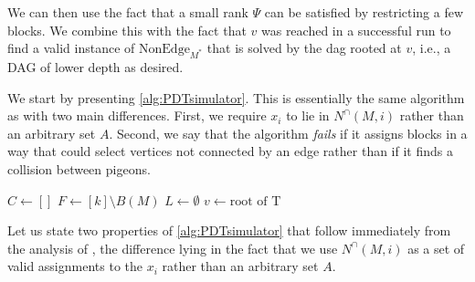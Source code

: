 We can then use the fact that a small rank $\Psi$ can be satisfied
by restricting a few blocks. We combine this with the fact that $v$ was reached in a successful run to find a valid instance of $\mathrm{NonEdge}_{M^*}$ that is solved by the dag rooted at $v$, i.e., a DAG of lower depth as desired.

We start by presenting \autoref{alg:PDTsimulator}. This is essentially the same algorithm as \cite[Algorithm 1]{BI25bphp} with two main differences. First, we require $x_i$ to lie in $N^\cap(M,i)$ rather than an arbitrary set $A$. Second, we say that the algorithm \emph{fails} if it assigns blocks in a way that could select vertices not connected by an edge rather than if it finds a collision between pigeons.  

\begin{algorithm2e}[t!]
\caption{Random walk simulator}
\label{alg:PDTsimulator}
    $C\leftarrow []$
    $F\leftarrow [k]\setminus B(M)$ 
    $L\leftarrow \emptyset$
    $v\leftarrow \text{root of T}$\;
\end{algorithm2e}


Let us state two properties of \autoref{alg:PDTsimulator} that follow immediately from the analysis of \cite{BI25bphp}, the difference lying in the fact that we use $N^\cap(M,i)$ as a set of valid assignments to the $x_i$ rather than an arbitrary set $A$.

